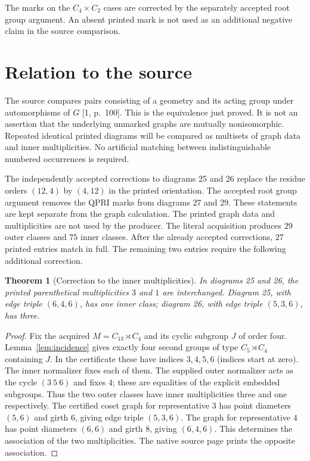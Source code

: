 \documentclass[11pt]{article}
\newtheorem{theorem}{Theorem}
\begin{document}
The marks on the $C_4\times C_2$ cases are corrected by the separately
accepted root group argument. An absent printed mark is not used as an
additional negative claim in the source comparison.

\section{Relation to the source}
The source compares pairs consisting of a geometry and its acting group
under automorphisms of $G$ [1, p.~100]. This is the equivalence just proved.
It is not an assertion that the underlying unmarked graphs are mutually
nonisomorphic. Repeated identical printed diagrams will be compared as
multisets of graph data and inner multiplicities. No artificial matching
between indistinguishable numbered occurrences is required.

The independently accepted corrections to diagrams 25 and 26 replace
the residue orders $(12,4)$ by $(4,12)$ in the printed orientation.
The accepted root group argument removes the QPRI marks from diagrams
27 and 29. These statements are kept separate from the graph calculation.
The printed graph data and multiplicities are not used by the producer.
The literal acquisition produces $29$ outer classes and $75$ inner classes.
After the already accepted corrections, $27$ printed entries match in full.
The remaining two entries require the following additional correction.

\begin{theorem}[Correction to the inner multiplicities]
In diagrams 25 and 26, the printed parenthetical multiplicities $3$ and $1$
are interchanged. Diagram 25, with edge triple $(6,4,6)$, has one inner class;
diagram 26, with edge triple $(5,3,6)$, has three.
\end{theorem}
\begin{proof}
Fix the acquired $M=C_{13}\rtimes C_4$ and its cyclic subgroup $J$ of order
four. Lemma~\ref{lem:incidence} gives exactly four second groups of type
$C_5\rtimes C_4$ containing $J$. In the certificate these have indices
$3,4,5,6$ (indices start at zero). The inner normalizer fixes each of them.
The supplied outer normalizer acts as the cycle $(3\ 5\ 6)$ and fixes $4$;
these are equalities of the explicit embedded subgroups. Thus the two
outer classes have inner multiplicities three and one respectively.
The certified coset graph for representative $3$ has point diameters
$(5,6)$ and girth $6$, giving edge triple $(5,3,6)$. The graph for
representative $4$ has point diameters $(6,6)$ and girth $8$, giving
$(6,4,6)$. This determines the association of the two multiplicities.
The native source page prints the opposite association.
\end{proof}
\end{document}

